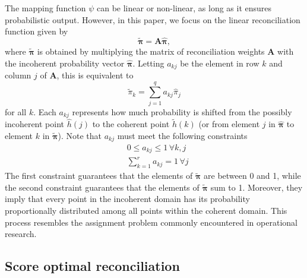 \documentclass[a4paper,review,12pt,authoryear]{elsarticle}
\newcommand{\bpi}{\bm{\pi}}
\begin{document}
    The mapping function $\psi$ can be linear or non-linear, as long as it ensures probabilistic output. 
    However, in this paper, we focus on the linear reconciliation function given by
    \begin{equation}
      \label{eq:framework}
    \tilde{\bpi}=\bm{A}\hat{\bpi},
    \end{equation}
    where $\tilde{\bpi}$ is obtained by multiplying the matrix of reconciliation weights $\bm{A}$ with the incoherent probability vector $\hat{\bpi}$. Letting $a_{kj}$ be the element in row $k$ and column $j$ of $\bm{A}$, this is equivalent to
    \[
      \tilde{\pi}_k=\sum\limits_{j=1}^q a_{kj}\hat{{\pi}}_j
    \]
    for all $k$. 
    Each $a_{kj}$ represents how much probability is shifted from the possibly incoherent point $\hat{h}(j)$ to the coherent point $\tilde{h}(k)$ (or from element $j$ in $\hat{\bpi}$ to element $k$ in $\tilde{\bpi}$). Note that $a_{kj}$ must meet the following constraints
    \begin{align*}
    &0\leq a_{kj} \leq 1 \,\forall k, j\\ 
    &\sum\limits_{k=1}^r a_{kj} = 1 \,\forall j 
    \end{align*}
    The first constraint guarantees that the elements of $\tilde{\bpi}$ are between 0 and 1, while the second constraint guarantees that the elements of $\tilde{\bpi}$ sum to 1.
    Moreover, they imply that every point in the incoherent domain has its probability proportionally distributed among all points  within the coherent domain. 
    This process resembles the assignment problem commonly encountered in operational research.
    
    \subsection{Score optimal reconciliation}
    \label{sec:algorithm1}
\end{document}
